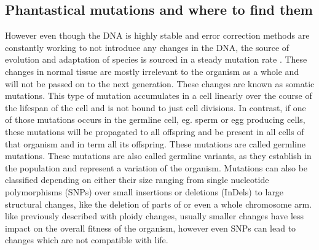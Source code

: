 \subsection[Mutations]{Phantastical mutations and where to find them}
\label{intro-sec:mutations}
However even though the DNA is highly stable and error correction methods are constantly working to not introduce any changes in the DNA, the source of evolution and adaptation of species is sourced in a steady mutation rate \cite{Darwin2010,Sprouffske2018}. These changes in normal tissue are mostly irrelevant to the organism as a whole and will not be passed on to the next generation. These changes are known as somatic mutations. This type of mutation accumulates in a cell linearly over the course of the lifespan of the cell and is not bound to just cell divisions\cite{Alexandrov2015,Moore2021}. 
In contrast, if one of those mutations occurs in the germline cell, eg. sperm or egg producing cells, these mutations will be propagated to all offspring and be present in all cells of that organism and in term all its offspring. These mutations are called germline mutations. These mutations are also called germline variants, as they establish in the population and represent a variation of the organism.
Mutations can also be classified depending on either their size ranging from single nucleotide polymorphisms (SNPs) over small insertions or deletions (InDels) to large structural changes, like the deletion of parts of or even a whole chromosome arm. like previously described with ploidy changes, usually smaller changes have less impact on the overall fitness of the organism, however even SNPs can lead to changes which are not compatible with life\cite{Shamseldin2015,Frey2021}.

